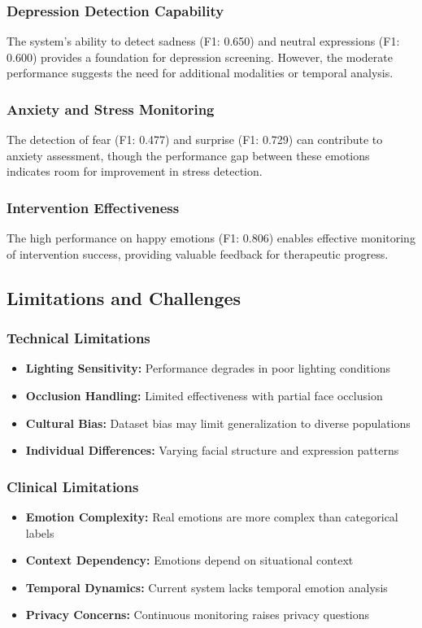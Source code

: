 \documentclass[conference]{IEEEtran}
\begin{document}
\subsubsection{Depression Detection Capability}
The system's ability to detect sadness (F1: 0.650) and neutral expressions (F1: 0.600) provides a foundation for depression screening. However, the moderate performance suggests the need for additional modalities or temporal analysis.

\subsubsection{Anxiety and Stress Monitoring}
The detection of fear (F1: 0.477) and surprise (F1: 0.729) can contribute to anxiety assessment, though the performance gap between these emotions indicates room for improvement in stress detection.

\subsubsection{Intervention Effectiveness}
The high performance on happy emotions (F1: 0.806) enables effective monitoring of intervention success, providing valuable feedback for therapeutic progress.

\subsection{Limitations and Challenges}

\subsubsection{Technical Limitations}
\begin{itemize}
    \item \textbf{Lighting Sensitivity:} Performance degrades in poor lighting conditions
    \item \textbf{Occlusion Handling:} Limited effectiveness with partial face occlusion
    \item \textbf{Cultural Bias:} Dataset bias may limit generalization to diverse populations
    \item \textbf{Individual Differences:} Varying facial structure and expression patterns
\end{itemize}

\subsubsection{Clinical Limitations}
\begin{itemize}
    \item \textbf{Emotion Complexity:} Real emotions are more complex than categorical labels
    \item \textbf{Context Dependency:} Emotions depend on situational context
    \item \textbf{Temporal Dynamics:} Current system lacks temporal emotion analysis
    \item \textbf{Privacy Concerns:} Continuous monitoring raises privacy questions
\end{itemize}
\end{document}
